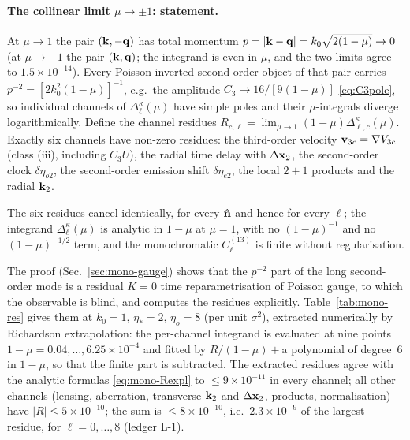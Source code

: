 \paragraph{The collinear limit $\mu\to\pm1$: statement.}  At $\mu\to1$ the pair $(\mathbf k,-\mathbf q)$ has total momentum $p=|\mathbf k-\mathbf q|=k_0\sqrt{2(1-\mu)}\to0$
(at $\mu\to-1$ the pair $(\mathbf k,\mathbf q)$; the integrand is even in $\mu$, and the two limits agree to $1.5\times10^{-14}$).  Every Poisson-inverted
second-order object of that pair carries $p^{-2}=[2k_0^2(1-\mu)]^{-1}$, e.g.\ the amplitude $C_3\to16/[9(1-\mu)]$ \eqref{eq:C3pole}, so individual
channels of $\Delta^\kappa_\ell(\mu)$ have simple poles and their $\mu$-integrals diverge logarithmically.  Define the channel residues
$R_{c,\ell}=\lim_{\mu\to1}(1-\mu)\Delta^\kappa_{\ell,c}(\mu)$.  Exactly six channels have non-zero residues: the third-order velocity
$\mathbf v_{3c}=\nabla V_{3c}$ (class (iii), including $C_3U$), the radial time delay with $\Delta\mathbf x_2$, the second-order clock $\delta\eta_{o2}$, the
second-order emission shift $\delta\eta_{e2}$, the local $2{+}1$ products and the radial $\mathbf k_2$.
\begin{proposition}\label{prop:mono-residues}
The six residues cancel identically, for every $\hat{\mathbf n}$ and hence for every $\ell$; the integrand $\Delta^\kappa_\ell(\mu)$ is analytic in $1-\mu$ at
$\mu=1$, with no $(1-\mu)^{-1}$ and no $(1-\mu)^{-1/2}$ term, and the monochromatic $C^{(13)}_\ell$ is finite without regularisation.
\end{proposition}
The proof (Sec.~\ref{sec:mono-gauge}) shows that the $p^{-2}$ part of the long second-order mode is a residual $K=0$ time reparametrisation
of Poisson gauge, to which the observable is blind, and computes the residues explicitly.  Table~\ref{tab:mono-res} gives them at
$k_0=1$, $\eta_*=2$, $\eta_o=8$ (per unit $\sigma^2$), extracted numerically by Richardson extrapolation: the per-channel integrand is evaluated at
nine points $1-\mu=0.04,\dots,6.25\times10^{-4}$ and fitted by $R/(1-\mu)+{}$a polynomial of degree~6 in $1-\mu$, so that the finite part is
subtracted.  The extracted residues agree with the analytic formulas \eqref{eq:mono-Rexpl} to $\le9\times10^{-11}$ in every channel; all other
channels (lensing, aberration, transverse $\mathbf k_2$ and $\Delta\mathbf x_2$, products, normalisation) have $|R|\le5\times10^{-10}$; the sum is
$\le8\times10^{-10}$, i.e.\ $2.3\times10^{-9}$ of the largest residue, for $\ell=0,\dots,8$ (ledger L-1).
